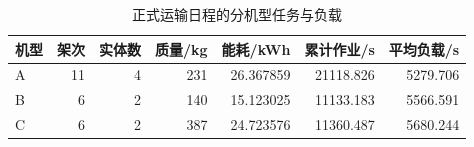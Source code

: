 \begin{table}[htbp]\centering\small
\caption{正式运输日程的分机型任务与负载}\label{tab:rev_q2_types}
\begin{tabular}{lrrrrrr}\toprule
机型 & 架次 & 实体数 & 质量/kg & 能耗/kWh & 累计作业/s & 平均负载/s\\\midrule
A & 11 & 4 & 231 & 26.367859 & 21118.826 & 5279.706\\
B & 6 & 2 & 140 & 15.123025 & 11133.183 & 5566.591\\
C & 6 & 2 & 387 & 24.723576 & 11360.487 & 5680.244\\
\bottomrule\end{tabular}
\end{table}
